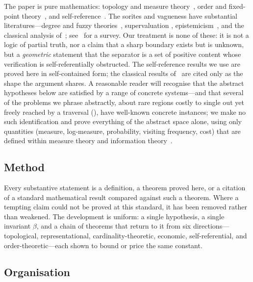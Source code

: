 \documentclass[11pt,a4paper]{article}
\theoremstyle{thmstyle}
\theoremstyle{definition}
\theoremstyle{remark}
\newcommand{\thick}{\beta}
\begin{document}
The paper is pure mathematics: topology and measure theory~\citep{kelley1955,%
munkres2000,halmos1950,federer1969,mattila1995,engelking1995,hurewicz1941},
order and fixed-point theory~\citep{birkhoff1967,daveypriestley2002,%
tarski1955}, and self-reference~\citep{russell1903,cantor1891,tarski1936,%
godel1931,lawvere1969}. The sorites and vagueness have substantial
literatures---degree and fuzzy theories~\citep{zadeh1965}, supervaluation
\citep{fine1975,keefe2000}, epistemicism~\citep{williamson1994}, and the
classical analysis of~\citet{black1937}; see~\citet{hyderaffman2018} for a
survey. Our treatment is none of these: it is not a logic of partial truth,
nor a claim that a sharp boundary exists but is unknown, but a
\emph{geometric} statement that the separator is a set of positive content
whose verification is self-referentially obstructed. The self-reference
results we use are proved here in self-contained form; the classical results
of~\citet{russell1903,cantor1891,tarski1936} are cited only as the shape the
argument shares. A reasonable reader will recognise that the abstract
hypotheses below are satisfied by a range of concrete systems---and that several
of the problems we phrase abstractly, about rare regions costly to single out yet
freely reached by a traversal (), have well-known concrete
instances; we make no such identification and prove everything of the abstract
space alone, using only quantities (measure, log-measure, probability, visiting
frequency, cost) that are defined within measure theory and information
theory~\citep{shannon1948,cover2006}.

\subsection{Method}

Every substantive statement is a definition, a theorem proved here, or a
citation of a standard mathematical result compared against such a theorem.
Where a tempting claim could not be proved at this standard, it has been
removed rather than weakened. The development is uniform: a single hypothesis,
a single invariant $\thick$, and a chain of theorems that return to it from
six directions---topological, representational, cardinality-theoretic,
economic, self-referential, and order-theoretic---each shown to bound or price
the same constant.

\subsection{Organisation}
\end{document}
